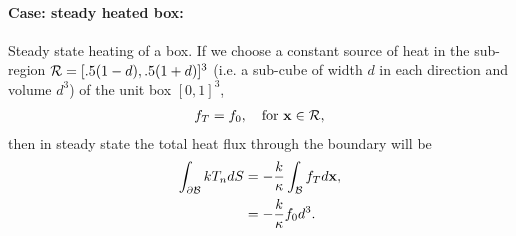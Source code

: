 \paragraph{Case: steady heated box:} Steady state heating of a box. If we choose a constant source
of heat in the sub-region ${\mathcal R}=[.5(1-d),.5(1+d)]^3$ (i.e. a sub-cube of width $d$ in each direction and volume $d^3$) of the unit box $[0,1]^3$,
\begin{align}
    f_T = f_0 , \quad \text{for $\mathbf{ x}\in {\mathcal R}$}, 
\end{align}
then in steady state the total heat flux through the boundary will be
\begin{align}
    \int_{\partial{\mathcal B}} k T_n dS &= - \frac{k}{\kappa} \int_{{\mathcal B}} f_T d\mathbf{ x} , \\
                                &= - \frac{k}{\kappa} f_0 d^3 . 
\end{align}
